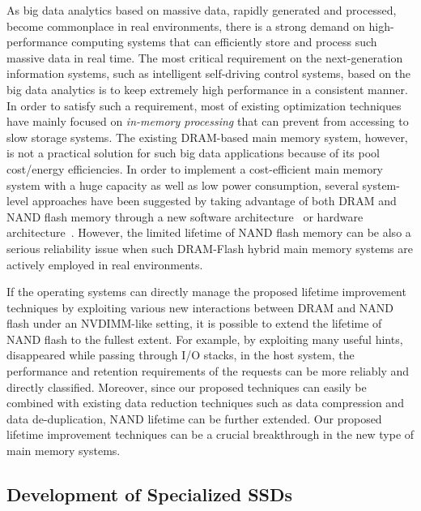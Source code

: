 As big data analytics based on massive data, rapidly generated and processed, become commonplace in real environments, there is a strong demand on high-performance computing systems that can efficiently store and process such massive data in real time.
The most critical requirement on the next-generation information systems, such as intelligent self-driving control systems, based on the big data analytics is to keep extremely high performance in a consistent manner.
In order to satisfy such a requirement, most of existing optimization techniques have mainly focused on \textit{in-memory processing} that can prevent from accessing to slow storage systems.
The existing DRAM-based main memory system, however, is not a practical solution for such big data applications because of its pool cost/energy efficiencies.
In order to implement a cost-efficient main memory system with a huge capacity as well as low power consumption, several system-level approaches have been suggested by taking advantage of both DRAM and NAND flash memory through a new software architecture~\cite{SSDAlloc_Badam} or hardware architecture~\cite{FlashMainMemory_Jacob}.
However, the limited lifetime of NAND flash memory can be also a serious reliability issue when such DRAM-Flash hybrid main memory systems are actively employed in real environments.


If the operating systems can directly manage the proposed lifetime improvement techniques by exploiting various new interactions between DRAM and NAND flash under an NVDIMM-like setting, it is possible to extend the lifetime of NAND flash to the fullest extent.
For example, by exploiting many useful hints, disappeared while passing through I/O stacks, in the host system, the performance and retention requirements of the requests can be more reliably and directly classified.
Moreover, since our proposed techniques can easily be combined with existing data reduction techniques such as data compression and data de-duplication, NAND lifetime can be further extended.
Our proposed lifetime improvement techniques can be a crucial breakthrough in the new type of main memory systems.


\subsection{Development of Specialized SSDs}

